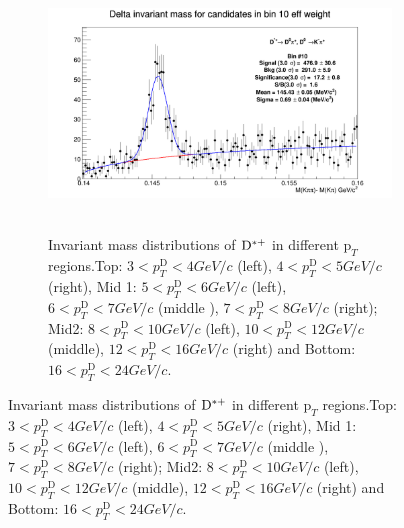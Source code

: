 \begin{enumerate}
\begin{figure}
\begin{enumerate}
\begin{figure}[!htp]
{\includegraphics[width=1\linewidth, height=6cm]{figures/Dstar_wEFF/InvMassDistributions_Dstar_Bins10to10.png}}

\caption{Invariant mass distributions of ${\rm D^{*+}}$ in different $\text{p}_T$ regions.Top: $3< p_{T}^{\text{D}}< 4 GeV/c$ (left), $4< p_{T}^{\text{D}}< 5 GeV/c$ (right), Mid 1: $5< p_{T}^{\text{D}}< 6 GeV/c$ (left), $6 < p_{T}^{\text{D}} < 7 GeV/c$ (middle ), $7< p_{T}^{\text{D}}< 8 GeV/c$ (right); Mid2: $8< p_{T}^{\text{D}}< 10GeV/c$ (left), $10< p_{T}^{\text{D}}< 12 GeV/c$ (middle), $12 < p_{T}^{\text{D}}< 16 GeV/c$ (right) and Bottom: $16<p_{T}^{\text{D}}< 24 GeV/c$.}
\label{fig:InvMass}
\end{figure}





\end{enumerate}
\end{figure}
\end{enumerate}
